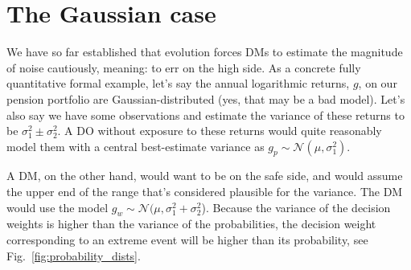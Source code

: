 \documentclass[11pt]{article}
\newcommand{\ie}{{\it i.e.}\xspace}
\newcommand{\fref}[1]{Fig.~\ref{fig:#1}}
\newcommand{\ND}{\mathcal{N}} %
\numberwithin{equation}{section}
\begin{document}
\section{The Gaussian case}
%
%
We have so far established that evolution forces DMs to estimate the magnitude of noise cautiously, meaning: to err on the high side.
As a concrete fully quantitative formal example, let's say the annual logarithmic returns, $g$, on our pension portfolio are Gaussian-distributed (yes, that may be a bad model). Let's also say we have some observations and estimate the variance of these returns to be $\sigma_1^2 \pm \sigma_2^2$. A DO without exposure to these returns would quite reasonably model them with a central best-estimate variance as $g_p \sim \ND(\mu, \sigma_1^2)$.

A DM, on the other hand, would want to be on the safe side, and would assume the upper end of the range that's considered plausible for the variance. The DM would use the model $g_w \sim \ND(\mu, \sigma_1^2+\sigma_2^2$). Because the variance of the decision weights is higher than the variance of the probabilities, the decision weight corresponding to an extreme event will be higher than its probability, see \fref{probability_dists}.
\end{document}
